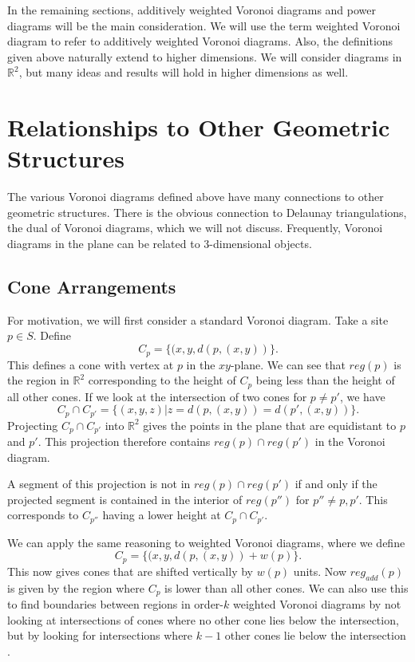 \documentclass[12pt]{article}
\newcommand{\R}{\mathbb{R}}
\begin{document}
In the remaining sections, additively weighted Voronoi diagrams and power diagrams will be the main consideration. We will use the term weighted
Voronoi diagram to refer to additively weighted Voronoi diagrams. Also, the definitions given above naturally extend to higher dimensions. We will
consider diagrams in $\R^2$, but many ideas and results will hold in higher dimensions as well.

\section{Relationships to Other Geometric Structures}
The various Voronoi diagrams defined above have many connections to other geometric structures. There is the obvious connection to Delaunay
triangulations, the dual of Voronoi diagrams, which we will not discuss. Frequently, Voronoi diagrams in the plane can be related to 3-dimensional
objects.

\subsection{Cone Arrangements}
\label{cone}
For motivation, we will first consider a standard Voronoi diagram. Take a site $p \in S$. Define
\[ C_p = \{ (x, y, d(p, (x,y)) \}. \]
This defines a cone with vertex at $p$ in the $xy$-plane. We can see that $reg(p)$ is the region in $\R^2$ corresponding to the height of $C_p$ being
less than the height of all other cones. If we look at the intersection of two cones for $p \neq p'$, we have
\[ C_p \cap C_{p'} = \{ (x,y,z) | z = d(p, (x,y)) = d(p', (x,y)) \}. \]
Projecting $C_p \cap C_{p'}$ into $\R^2$ gives the points in the plane that are equidistant to $p$ and $p'$. This projection therefore contains
$reg(p) \cap reg(p')$ in the Voronoi diagram.

A segment of this projection is not in $reg(p) \cap reg(p')$ if and only if the projected segment is contained in the interior of $reg(p'')$ for $p''
\neq p, p'$. This corresponds to $C_{p''}$ having a lower height at $C_p \cap C_{p'}$.

We can apply the same reasoning to weighted Voronoi diagrams, where we define
\[ C_p = \{ (x, y, d(p, (x,y)) + w(p) \}. \]
This now gives cones that are shifted vertically by $w(p)$ units. Now $reg_{add}(p)$ is given by the region where $C_p$ is lower than all other cones.
We can also use this to find boundaries between regions in order-$k$ weighted Voronoi diagrams by not looking at intersections of cones where no other
cone lies below the intersection, but by looking for intersections where $k-1$ other cones lie below the intersection \cite{rosenberger_additive}.
\end{document}
